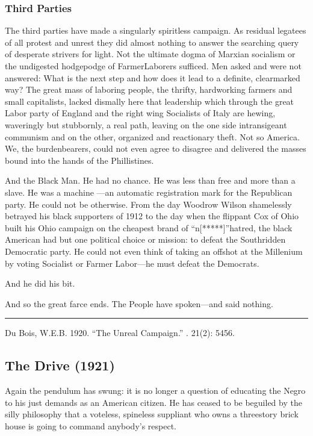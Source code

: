 \documentclass[letterpaper,10pt,english]{jupyterBook}
\begin{document}
\subsubsection{Third Parties}
\label{\detokenize{Volumes/21/02/unreal_campaign:third-parties}}
\sphinxAtStartPar
The third parties have made a singularly spiritless campaign. As residual legatees of all protest and unrest they did almost nothing to answer the searching query of desperate strivers for light. Not the ultimate dogma of Marxian socialism or the undigested hodge\sphinxhyphen{}podge of Farmer\sphinxhyphen{}Laborers sufficed. Men asked and were not answered: What is the next step and how does it lead to a definite, clearmarked way? The great mass of laboring people, the thrifty, hardworking farmers and small capitalists, lacked dismally here that leadership which through the great Labor party of England and the right wing Socialists of Italy are hewing, waveringly but stubbornly, a real path, leaving on the one side intransigeant communism and on the other, organized and reactionary theft. Not so America. We, the burden\sphinxhyphen{}bearers, could not even agree to disagree and delivered the masses bound into the hands of the Phillistines.

\sphinxAtStartPar
And the Black Man. He had no chance. He was less than free and more than a slave. He was a machine —an automatic registration mark for the Republican party. He could not be otherwise. From the day Woodrow Wilson shamelessly betrayed his black supporters of 1912 to the day when the flippant Cox of Ohio built his Ohio campaign on the cheapest brand of “n{[}*****{]}”\sphinxhyphen{}hatred, the black American had but one political choice or mission: to defeat the South\sphinxhyphen{}ridden Democratic party. He could not even think of taking an off\sphinxhyphen{}shot at the Millenium by voting Socialist or Farmer Labor—he must defeat the Democrats.

\sphinxAtStartPar
And he did his bit.

\sphinxAtStartPar
And so the great farce ends. The People have spoken—and said nothing.


\bigskip\hrule\bigskip


\sphinxAtStartPar
{} Du Bois, W.E.B. 1920. “The Unreal Campaign.” . 21(2): 54\sphinxhyphen{}56.


\subsection{The Drive (1921)}
\label{\detokenize{Volumes/22/01/drive:the-drive-1921}}\label{\detokenize{Volumes/22/01/drive::doc}}
\sphinxAtStartPar
Again the pendulum has swung: it is no longer a question of educating the Negro to his just demands as an American citizen. He has ceased to be beguiled by the silly philosophy that a voteless, spineless suppliant who owns a three\sphinxhyphen{}story brick house is going to command anybody’s respect.
\end{document}
